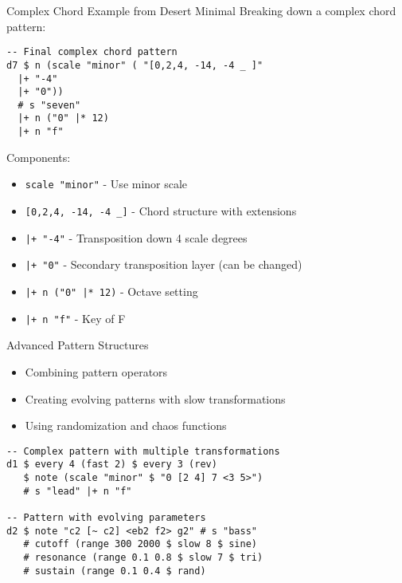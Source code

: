 \documentclass{beamer}
\begin{document}
\begin{frame}[fragile]{Complex Chord Example from Desert Minimal}
Breaking down a complex chord pattern:

\begin{lstlisting}[style=tidal]
-- Final complex chord pattern
d7 $ n (scale "minor" ( "[0,2,4, -14, -4 _ ]" 
  |+ "-4" 
  |+ "0")) 
  # s "seven" 
  |+ n ("0" |* 12) 
  |+ n "f" 
\end{lstlisting}

Components:
\begin{itemize}
    \item \texttt{scale "minor"} - Use minor scale
    \item \texttt{[0,2,4, -14, -4 \_]} - Chord structure with extensions
    \item \texttt{|+ "-4"} - Transposition down 4 scale degrees
    \item \texttt{|+ "0"} - Secondary transposition layer (can be changed)
    \item \texttt{|+ n ("0" |* 12)} - Octave setting
    \item \texttt{|+ n "f"} - Key of F
\end{itemize}
\end{frame}



\begin{frame}[fragile]{Advanced Pattern Structures}
\begin{itemize}
    \item Combining pattern operators
    \item Creating evolving patterns with slow transformations
    \item Using randomization and chaos functions
\end{itemize}

\begin{lstlisting}[style=tidal]
-- Complex pattern with multiple transformations
d1 $ every 4 (fast 2) $ every 3 (rev) 
   $ note (scale "minor" $ "0 [2 4] 7 <3 5>") 
   # s "lead" |+ n "f"

-- Pattern with evolving parameters
d2 $ note "c2 [~ c2] <eb2 f2> g2" # s "bass"
   # cutoff (range 300 2000 $ slow 8 $ sine)
   # resonance (range 0.1 0.8 $ slow 7 $ tri)
   # sustain (range 0.1 0.4 $ rand)
\end{lstlisting}
\end{frame}


\end{document}
